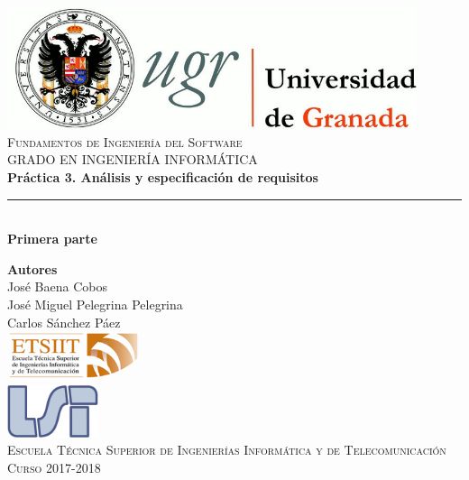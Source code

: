 \documentclass[12pt,spanish]{article}
\begin{document}
\begin{titlepage}

\newlength{\centeroffset}
\setlength{\centeroffset}{-0.5\oddsidemargin}
\addtolength{\centeroffset}{0.5\evensidemargin}
\thispagestyle{empty}

\noindent\hspace*{\centeroffset}\begin{minipage}{\textwidth}

\centering
\includegraphics[width=0.9\textwidth]{logo_ugr.jpg}\\[1.4cm]

\textsc{ \Large Fundamentos de Ingeniería del Software\\[0.2cm]}
\textsc{GRADO EN INGENIERÍA INFORMÁTICA}\\[1cm]

{\Large\bfseries Práctica 3. Análisis y especificación de requisitos\\
}
\noindent\rule[-1ex]{\textwidth}{3pt}\\[3.5ex]
{\normalsize\bfseries Primera parte}
\end{minipage}

\vspace{2.5cm}
\noindent\hspace*{\centeroffset}
\begin{minipage}{\textwidth}
\centering

\textbf{Autores}\\ {José Baena Cobos \\ José Miguel Pelegrina Pelegrina\\Carlos Sánchez Páez}\\[2.5ex]
\includegraphics[width=0.3\textwidth]{etsiit_logo.png}\\[0.1cm]
\vspace{1.5cm}
\includegraphics[width=0.2\textwidth]{lsi.png}\\[0.1cm]
\vspace{1cm}
\textsc{Escuela Técnica Superior de Ingenierías Informática y de Telecomunicación}\\
\vspace{1cm}
\textsc{Curso 2017-2018}
\end{minipage}
\end{titlepage}
\tableofcontents
\thispagestyle{empty}
\listoffigures
\newpage
\setcounter{page}{1}
\end{document}

